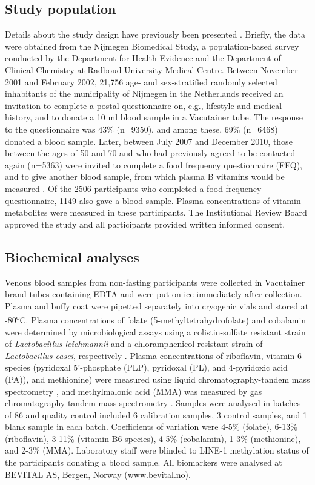 \subsection[]{Study population}
\noindent Details about the study design have previously been presented \cite{c321}. Briefly, the data were obtained from the Nijmegen Biomedical Study, a population-based survey conducted by the Department for Health Evidence and the Department of Clinical Chemistry at Radboud University Medical Centre. Between November 2001 and February 2002, 21,756 age- and sex-stratified randomly selected inhabitants of the municipality of Nijmegen in the Netherlands received an invitation to complete a postal questionnaire on, e.g., lifestyle and medical history, and to donate a 10 ml blood sample in a Vacutainer tube. The response to the questionnaire was 43\% (n=9350), and among these, 69\% (n=6468) donated a blood sample. Later, between July 2007 and December 2010, those between the ages of 50 and 70 and who had previously agreed to be contacted again (n=5363) were invited to complete a food frequency questionnaire (FFQ), and to give another blood sample, from which plasma B vitamins would be measured \cite{c322}. Of 
the 2506 participants who completed a food frequency questionnaire, 1149 also gave a blood sample. Plasma concentrations of vitamin metabolites were measured in these participants. The Institutional Review Board approved the study and all participants provided written informed consent.

\subsection{Biochemical analyses} %
\noindent Venous blood samples from non-fasting participants were collected in Vacutainer brand tubes containing EDTA and were put on ice immediately after collection. Plasma and buffy coat were pipetted separately into cryogenic vials and stored at -80\textsuperscript{o}C. Plasma concentrations of folate (5-methyltetrahydrofolate) and cobalamin were determined by microbiological assays using a colistin-sulfate resistant strain of \emph{Lactobacillus leichmannii} and a chloramphenicol-resistant strain of \emph{Lactobacillus casei}, respectively \cite{c323,c324}. Plasma concentrations of riboflavin, vitamin 6 species (pyridoxal 5'-phosphate (PLP), pyridoxal (PL), and 4-pyridoxic acid (PA)), and methionine) were measured using liquid chromatography-tandem mass spectrometry \cite{c325,c326}, and methylmalonic acid (MMA) was measured by gas chromatography-tandem mass spectrometry \cite{c327}. Samples were analysed in batches of 86 and quality control included 6 calibration samples, 3 control samples, and 1 blank 
sample in each batch. Coefficients of variation were 4-5\% (folate), 6-13\% (riboflavin), 3-11\% (vitamin B6 species), 4-5\% (cobalamin), 1-3\% (methionine), and 2-3\% (MMA). Laboratory staff were blinded to LINE-1 methylation status of the participants donating a blood sample. All biomarkers were analysed at BEVITAL AS, Bergen, Norway (www.bevital.no).

